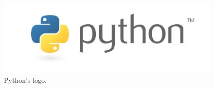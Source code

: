 \begin{frame}
\begin{center}
\begin{figure}
\includegraphics[scale=0.25]{python-logo.png}
\caption{Python's logo.}
\end{figure}
\end{center}
\end{frame}

